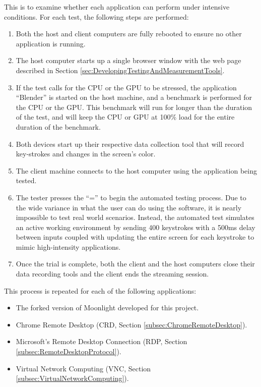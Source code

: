 \noindent
This is to examine whether each application can perform under intensive conditions.
For each test, the following steps are performed:

\begin{enumerate}
  \item Both the host and client computers are fully rebooted to ensure no other application is running.
  \item The host computer starts up a single browser window with the web page described in Section \ref{sec:DevelopingTestingAndMeasurementTools}.
  \item If the test calls for the CPU or the GPU to be stressed, the application \enquote{Blender} is started on the host machine, and a benchmark is performed for the CPU or the GPU.
        This benchmark will run for longer than the duration of the test, and will keep the CPU or GPU at 100\% load for the entire duration of the benchmark.
  \item Both devices start up their respective data collection tool that will record key-strokes and changes in the screen's color.
  \item The client machine connects to the host computer using the application being tested.
  \item The tester presses the \enquote{=} to begin the automated testing process.
        Due to the wide variance in what the user can do using the software, it is nearly impossible to test real world scenarios.
        Instead, the automated test simulates an active working environment by sending 400 keystrokes with a 500ms delay between inputs coupled with updating the entire screen for each keystroke to mimic high-intensity applications.
  \item Once the trial is complete, both the client and the host computers close their data recording tools and the client ends the streaming session.
\end{enumerate}

\noindent
This process is repeated for each of the following applications:

\begin{itemize}
  \item The forked version of Moonlight developed for this project.
  \item Chrome Remote Desktop (CRD, Section \ref{subsec:ChromeRemoteDesktop}).
  \item Microsoft's Remote Desktop Connection (RDP, Section \ref{subsec:RemoteDesktopProtocol}).
  \item Virtual Network Computing (VNC, Section \ref{subsec:VirtualNetworkComputing}).
\end{itemize}

